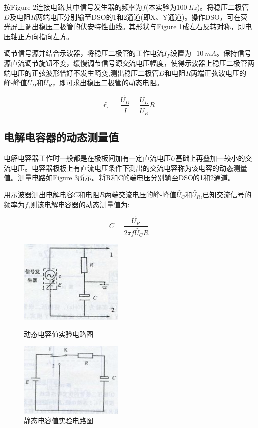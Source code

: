 \documentclass{article}
\begin{document}
按Figure 2连接电路,其中信号发生器的频率为$f$(本实验为$100\ Hz$)。将稳压二极管$D$及电阻$R$两端电压分别输至DSO的1和2通道(即X、Y通道)。操作DSO，可在荧光屏上调出稳压二极管的伏安特性曲线。其形状与Figure 1成左右反转对称，即电压轴正方向指向左方。

调节信号源并结合示波器，将稳压二极管的工作电流$I_P$设置为$-10\ mA$。保持信号源直流调节旋钮不变，缓慢调节信号源交流电压幅度，使得示波器上稳压二极管两端电压的正弦波形恰好不发生畸变,测出稳压二极管$D$和电阻$R$两端正弦波电压的峰-峰值$\widetilde{U_D}$和$\widetilde{U_R}$，即可求出稳压二极管的动态电阻。

$$
\widetilde{r_{\backsim}}=\frac{\widetilde{U_D}}{\widetilde{I}}=\frac{\widetilde{U_D}}{\widetilde{U_R}}R
$$

\subsection{电解电容器的动态测量值}
电解电容器工作时一般都是在极板间加有一定直流电压$U$基础上再叠加一较小的交流电压。电容器极板上有直流电压条件下测出的交流电容称为该电容的动态测量值。测量电路如Figure 3所示。将R和C的端电压分别输至DSO的1和2通道。

用示波器测出电解电容$C$和电阻$R$两端交流电压的峰-峰值$\widetilde{U_C}$和$\widetilde{U_R}$,已知交流信号的频率为$f$,则该电解电容器的动态测量值为:

$$
C=\frac{\widetilde{U_R}}{2\pi f\widetilde{U_C}R}
$$

\begin{figure}[!ht]
    \centering
    \begin{minipage}{0.45\textwidth} %
        \centering
        \includegraphics[width=5cm]{3.png} %
        \caption{动态电容值实验电路图}
    \end{minipage}\hfill
    \begin{minipage}{0.45\textwidth}
        \centering
        \includegraphics[width=5cm]{4.png} %
        \caption{静态电容值实验电路图}
    \end{minipage}
\end{figure}
\end{document}
